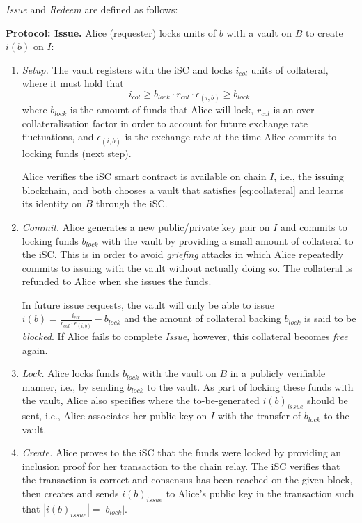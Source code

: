\emph{Issue} and \emph{Redeem} are defined as follows:

\textbf{Protocol: Issue.} Alice (requester) locks units of $b$ with a vault on $B$ to create $i(b)$ on $I$:
\begin{enumerate}
    \item \emph{Setup.}
    The vault registers with the \textsf{iSC} and locks $i_{col}$ units of collateral, where it must hold that
    \begin{equation}\label{eq:collateral}
        i_{col} \geq b_{lock} \cdot r_{col} \cdot \epsilon_{(i,b)} \geq b_{lock}
    \end{equation}
    where $b_{lock}$ is the amount of funds that Alice will lock, $r_{col}$ is an over-collateralisation factor in order to account for future exchange rate fluctuations, and $\epsilon_{(i,b)}$ is the exchange rate at the time Alice commits to locking funds (next step).
    
    Alice verifies the \textsf{iSC} smart contract is available on chain $I$, i.e., the issuing blockchain, and both chooses a vault that satisfies \cref{eq:collateral} and learns its identity on $B$ through the \textsf{iSC}.
    
    \item \emph{Commit.}
    Alice generates a new public/private key pair on $I$ and commits to locking funds $b_{lock}$ with the vault by providing a small amount of collateral to the \textsf{iSC}.
    This is in order to avoid \emph{griefing} attacks in which Alice repeatedly commits to issuing with the vault without actually doing so.
    The collateral is refunded to Alice when she issues the funds.
    
    In future issue requests, the vault will only be able to issue $i(b) = \frac{i_{col}}{r_{col} \cdot \epsilon_{(i,b)}} - b_{lock}$ and the amount of collateral backing $b_{lock}$ is said to be \emph{blocked}.
    If Alice fails to complete \emph{Issue}, however, this collateral becomes \emph{free} again.
    
    \item \emph{Lock.}
    Alice locks funds $b_{lock}$ with the vault on $B$ in a publicly verifiable manner, i.e., by sending $b_{lock}$ to the vault.
    As part of locking these funds with the vault, Alice also specifies where the to-be-generated $i(b)_{issue}$ should be sent, i.e., Alice associates her public key on $I$ with the transfer of $b_{lock}$ to the vault.
    
    \item \emph{Create.} Alice proves to the \textsf{iSC} that the funds were locked by providing an inclusion proof for her transaction to the chain relay.
    The \textsf{iSC} verifies that the transaction is correct and consensus has been reached on the given block, then creates and sends $i(b)_{issue}$ to Alice's public key in the transaction such that $|i(b)_{issue}| = |b_{lock}|$.
\end{enumerate}

